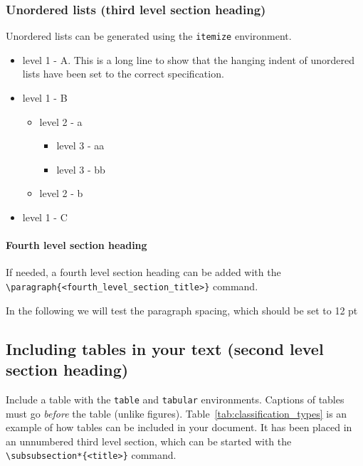 \documentclass{nato-sto}
\begin{document}
\subsubsection{Unordered lists (third level section heading)}

Unordered lists can be generated using the \verb|itemize| environment.

\begin{itemize}
\item level 1 - A. This is a long line to show that the hanging indent of unordered lists have been set to the correct specification.
\item level 1 - B
	\begin{itemize}
		\item level 2 - a
		\begin{itemize}
			\item level 3 - aa
			\item level 3 - bb
		\end{itemize}
		\item level 2 - b
	\end{itemize}
\item level 1 - C
\end{itemize}

\paragraph{Fourth level section heading}

If needed, a fourth level section heading can be added with the \verb|\paragraph{<fourth_level_section_title>}| command.

In the following we will test the paragraph spacing, which should be set to 12 pt

\lipsum[1]

\lipsum[2]

\lipsum[3]

\newpage

\subsection{Including tables in your text (second level section heading)}

Include a table with the \verb|table| and \verb|tabular| environments. Captions of tables must go \emph{before} the table (unlike figures). Table~\ref{tab:classification_types} is an example of how tables can be included in your document. It has been placed in an unnumbered third level section, which can be started with the \verb|\subsubsection*{<title>}| command.
\end{document}
